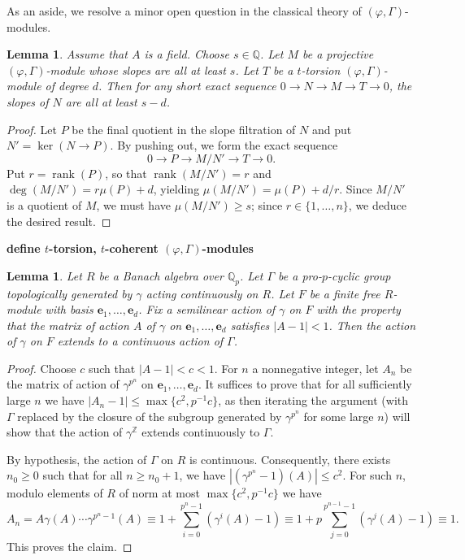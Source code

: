 \documentclass[12pt]{amsart}
\newtheorem{lemma}[theorem]{Lemma}
\theoremstyle{definition}
\numberwithin{equation}{theorem}
\newcommand{\be}{\mathbf{e}}
\newcommand{\QQ}{\mathbb{Q}}
\newcommand{\ZZ}{\mathbb{Z}}
\DeclareMathOperator{\rank}{rank}
\begin{document}
As an aside, we resolve a minor open question in the classical theory of $(\varphi, \Gamma)$-modules.

\begin{lemma} \label{L:modification slope bound}
Assume that $A$ is a field. 
Choose $s \in \QQ$.
Let $M$ be a projective $(\varphi, \Gamma)$-module whose slopes are all at least $s$.
Let $T$ be a $t$-torsion $(\varphi, \Gamma)$-module of degree $d$.
Then for any short exact sequence $0 \to N \to M \to T \to 0$,
the slopes of $N$ are all at least $s-d$.
\end{lemma}
\begin{proof}
Let $P$ be the final quotient in the slope filtration of $N$ and put $N' = \ker(N \to P)$.
By pushing out, we form the exact sequence 
\[
0 \to P \to M/N' \to T \to 0.
\]
Put $r = \rank(P)$, so that $\rank(M/N') = r$ and  $\deg(M/N') = r \mu(P)  + d$, yielding  $\mu(M/N') = \mu(P) + d/r$. Since $M/N'$ is a quotient of $M$, we must have
 $\mu(M/N') \geq s$; since $r \in \{1,\dots,n\}$, we deduce the desired result.
\end{proof}



\textbf{define $t$-torsion, $t$-coherent $(\varphi, \Gamma)$-modules}

\begin{lemma} \label{L:lift topological action}
Let $R$ be a Banach algebra over $\QQ_p$. Let $\Gamma$ be a pro-$p$-cyclic group topologically generated by $\gamma$ acting continuously on $R$. Let $F$ be a finite free $R$-module with basis $\be_1,\dots,\be_d$. Fix a semilinear action of $\gamma$ on $F$ with the property that the matrix of action $A$ of $\gamma$ on $\be_1,\dots,\be_d$ satisfies $\left| A-1 \right| < 1$.
Then the action of $\gamma$ on $F$ extends to a continuous action of $\Gamma$.
\end{lemma}
\begin{proof}
Choose $c$ such that $\left| A-1 \right| < c < 1$.
For $n$ a nonnegative integer, let $A_n$ be the matrix of action of $\gamma^{p^n}$
on $\be_1,\dots,\be_d$. It suffices to prove that for all sufficiently large $n$ we have
$\left| A_n-1 \right| \leq \max\{c^2, p^{-1}c\}$, as then iterating the argument (with $\Gamma$ replaced by the closure of the subgroup generated by $\gamma^{p^n}$ for some large $n$) will show that the action of $\gamma^{\ZZ}$ extends continuously to $\Gamma$.

By hypothesis, the action of $\Gamma$ on $R$ is continuous. Consequently, there exists 
$n_0 \geq 0$ such that for all $n \geq n_0+1$, we have $\left| (\gamma^{p^n}-1)(A) \right| \leq c^2$. For such $n$, modulo elements of $R$ of norm at most $\max\{c^2,p^{-1}c\}$ we have
\[
A_{n} = A \gamma(A) \cdots \gamma^{p^{n}-1}(A) \equiv 1 + \sum_{i=0}^{p^{n}-1} (\gamma^i(A)-1) \equiv 1 + p\sum_{j=0}^{p^{n-1}-1} (\gamma^{j}(A)-1) \equiv 1.
\]
This proves the claim.
\end{proof}
\end{document}

